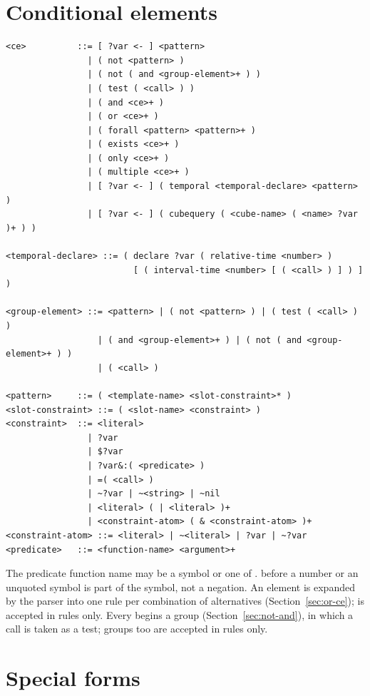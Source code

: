 \section{Conditional elements}

\begin{lstlisting}[style=shell]
<ce>          ::= [ ?var <- ] <pattern>
                | ( not <pattern> )
                | ( not ( and <group-element>+ ) )
                | ( test ( <call> ) )
                | ( and <ce>+ )
                | ( or <ce>+ )
                | ( forall <pattern> <pattern>+ )
                | ( exists <ce>+ )
                | ( only <ce>+ )
                | ( multiple <ce>+ )
                | [ ?var <- ] ( temporal <temporal-declare> <pattern> )
                | [ ?var <- ] ( cubequery ( <cube-name> ( <name> ?var )+ ) )

<temporal-declare> ::= ( declare ?var ( relative-time <number> )
                         [ ( interval-time <number> [ ( <call> ) ] ) ] )

<group-element> ::= <pattern> | ( not <pattern> ) | ( test ( <call> ) )
                  | ( and <group-element>+ ) | ( not ( and <group-element>+ ) )
                  | ( <call> )

<pattern>     ::= ( <template-name> <slot-constraint>* )
<slot-constraint> ::= ( <slot-name> <constraint> )
<constraint>  ::= <literal>
                | ?var
                | $?var
                | ?var&:( <predicate> )
                | =( <call> )
                | ~?var | ~<string> | ~nil
                | <literal> ( | <literal> )+
                | <constraint-atom> ( & <constraint-atom> )+
<constraint-atom> ::= <literal> | ~<literal> | ?var | ~?var
<predicate>   ::= <function-name> <argument>+
\end{lstlisting}

The predicate function name may be a symbol or one of . \fn{\textasciitilde} before a number or an
unquoted symbol is part of the symbol, not a negation. An 
element is expanded by the parser into one rule per combination of
alternatives (Section~\ref{sec:or-ce});  is accepted in
rules only. Every  begins a group
(Section~\ref{sec:not-and}), in which a call is taken as a test; groups
too are accepted in rules only.

\section{Special forms}

